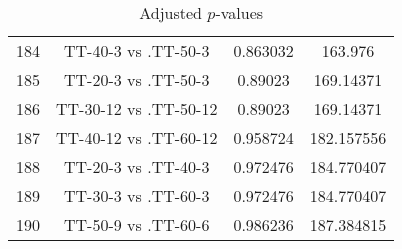 \documentclass[a4paper,10pt]{article}
\begin{document}
\begin{landscape}
\begin{table}[!htp]
\begin{tabular}{cccc}
184&TT-40-3 vs .TT-50-3&0.863032&163.976\\
185&TT-20-3 vs .TT-50-3&0.89023&169.14371\\
186&TT-30-12 vs .TT-50-12&0.89023&169.14371\\
187&TT-40-12 vs .TT-60-12&0.958724&182.157556\\
188&TT-20-3 vs .TT-40-3&0.972476&184.770407\\
189&TT-30-3 vs .TT-60-3&0.972476&184.770407\\
190&TT-50-9 vs .TT-60-6&0.986236&187.384815\\
\hline
\end{tabular}
\caption{Adjusted $p$-values}
\end{table}

\end{landscape}
\end{document}

